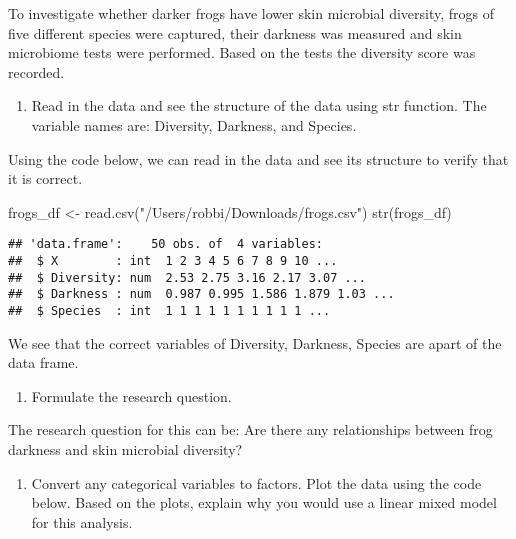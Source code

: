 \documentclass[
]{article}
\newenvironment{Shaded}{\begin{snugshade}}{\end{snugshade}}
\newcommand{\FunctionTok}[1]{\textcolor[rgb]{0.00,0.00,0.00}{#1}}
\newcommand{\NormalTok}[1]{#1}
\newcommand{\OtherTok}[1]{\textcolor[rgb]{0.56,0.35,0.01}{#1}}
\newcommand{\StringTok}[1]{\textcolor[rgb]{0.31,0.60,0.02}{#1}}
\providecommand{\tightlist}{%
  \setlength{\itemsep}{0pt}\setlength{\parskip}{0pt}}
\begin{document}
To investigate whether darker frogs have lower skin microbial diversity,
frogs of five different species were captured, their darkness was
measured and skin microbiome tests were performed. Based on the tests
the diversity score was recorded.

\begin{enumerate}
\def\labelenumi{\alph{enumi}.}
\tightlist
\item
  Read in the data and see the structure of the data using str function.
  The variable names are: Diversity, Darkness, and Species.
\end{enumerate}

Using the code below, we can read in the data and see its structure to
verify that it is correct.

\begin{Shaded}
\begin{Highlighting}[]
\NormalTok{frogs\_df }\OtherTok{\textless{}{-}} \FunctionTok{read.csv}\NormalTok{(}\StringTok{"/Users/robbi/Downloads/frogs.csv"}\NormalTok{)}
\FunctionTok{str}\NormalTok{(frogs\_df)}
\end{Highlighting}
\end{Shaded}

\begin{verbatim}
## 'data.frame':    50 obs. of  4 variables:
##  $ X        : int  1 2 3 4 5 6 7 8 9 10 ...
##  $ Diversity: num  2.53 2.75 3.16 2.17 3.07 ...
##  $ Darkness : num  0.987 0.995 1.586 1.879 1.03 ...
##  $ Species  : int  1 1 1 1 1 1 1 1 1 1 ...
\end{verbatim}

We see that the correct variables of Diversity, Darkness, Species are
apart of the data frame.

\begin{enumerate}
\def\labelenumi{\alph{enumi}.}
\setcounter{enumi}{1}
\tightlist
\item
  Formulate the research question.
\end{enumerate}

The research question for this can be: Are there any relationships
between frog darkness and skin microbial diversity?

\begin{enumerate}
\def\labelenumi{\alph{enumi}.}
\setcounter{enumi}{2}
\tightlist
\item
  Convert any categorical variables to factors. Plot the data using the
  code below. Based on the plots, explain why you would use a linear
  mixed model for this analysis.
\end{enumerate}
\end{document}

